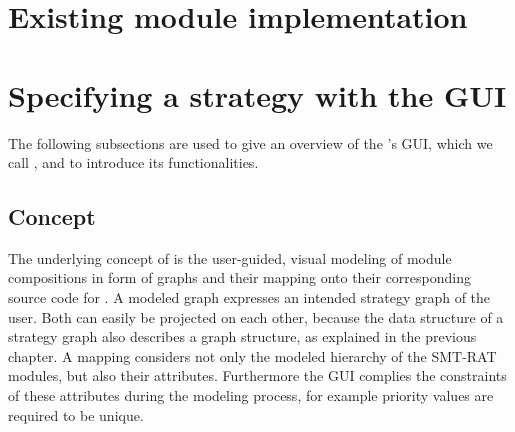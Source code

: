 \section{Existing module implementation}
%
%
%
%
%
%
%



\section{Specifying a strategy with the GUI}

The following subsections are used to give an overview of the 
 \smtrat's GUI, which we call \smtxrat, and to introduce its functionalities.

\subsection{Concept}
\label{sec:concept_of_smt-xrat}
The underlying concept of \smtxrat is the user-guided, visual 
modeling of module compositions in form of graphs and their 
mapping onto their corresponding source code for \smtrat. A 
modeled graph expresses an intended strategy graph of the user. 
Both can easily be projected on each other, because the data 
structure of a strategy graph also describes a graph structure, 
as explained in the previous chapter. A mapping considers not 
only the modeled hierarchy of the SMT-RAT modules, but also 
their attributes. Furthermore the GUI complies the constraints 
of these attributes during the modeling process, for example 
priority values are required to be unique.

